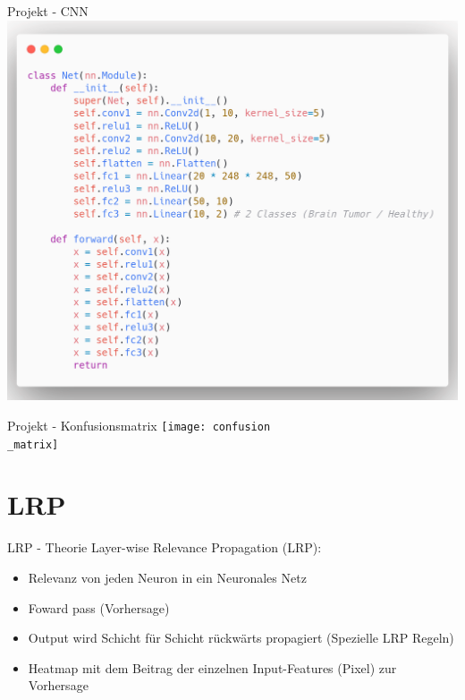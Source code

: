 \documentclass[ngerman,14pt,aspectratio=1610]{beamer}
\def\secname{Gliederung} %
\let\oldsection\section
\renewcommand{\section}[1]{
	\oldsection{#1}
	\newtotcounter{#1}
	\def\secname{#1}
}
\begin{document}
		\begin{frame}[t]{Projekt - CNN} \vspace{10pt}
			\centering
			\includegraphics[width=\linewidth, height=0.75\textheight, keepaspectratio]{net}
		\end{frame}
		
		\begin{frame}[t]{Projekt - Konfusionsmatrix} \vspace{10pt}
			\centering
			\texttt{[image: confusion\\\_matrix]}
		\end{frame}
		
	\section{LRP}
		\begin{frame}[t]{LRP - Theorie} \vspace{20pt}
			Layer-wise Relevance Propagation (LRP):
			\begin{itemize}
				\item Relevanz von jeden Neuron in ein Neuronales Netz
				\item Foward pass (Vorhersage)
				\item Output wird Schicht für Schicht rückwärts propagiert (Spezielle LRP Regeln)
				\item Heatmap mit dem Beitrag der einzelnen Input-Features (Pixel) zur Vorhersage
			\end{itemize}
		\end{frame}
		
\end{document}
